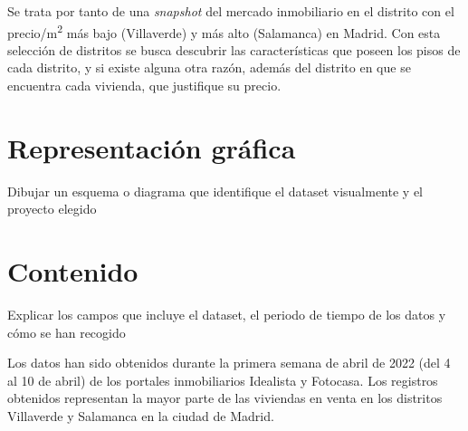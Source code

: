 \documentclass[12pt]{article}
\begin{document}
Se trata por tanto de una \textit{snapshot} del mercado inmobiliario en el distrito con el precio/m\textsuperscript{2} más bajo (Villaverde) y más alto (Salamanca) en Madrid. Con esta selección de distritos se busca descubrir las características que poseen los pisos de cada distrito, y si existe alguna otra razón, además del distrito en que se encuentra cada vivienda, que justifique su precio.

\vspace{-1.5em}\section{Representación gráfica}\vspace{-1.0em}

Dibujar un esquema o diagrama que identifique el
dataset visualmente y el proyecto elegido

\vspace{-1.5em}\section{Contenido}\vspace{-1.0em}

Explicar los campos que incluye el dataset, el periodo de tiempo de los datos y cómo se han recogido

Los datos han sido obtenidos durante la primera semana de abril de 2022 (del 4 al 10 de abril) de los portales inmobiliarios Idealista y Fotocasa. Los registros obtenidos representan la mayor parte de las viviendas en venta en los distritos Villaverde y Salamanca en la ciudad de Madrid.
\end{document}
